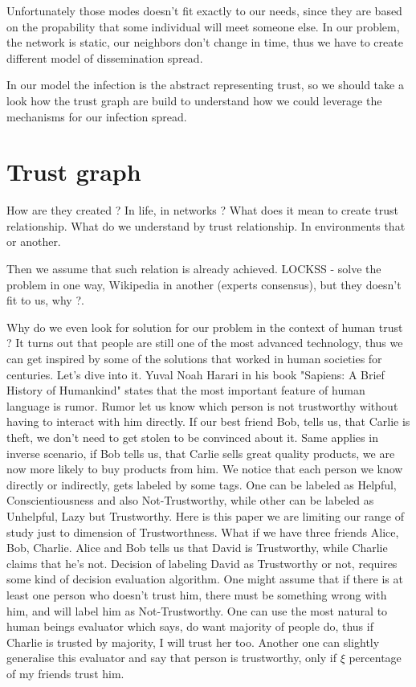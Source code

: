 \documentclass[nostrict]{szablonPG}
\begin{document}
Unfortunately those modes doesn't fit exactly to our needs, since they are based on the propability that some individual will meet someone else. In our problem, the network is static, our neighbors don't change in time, thus we have to create different model of dissemination spread. 

In our model the infection is the abstract representing trust, so we should take a look how the trust graph are build to understand how we could leverage the mechanisms for our infection spread.




\section{Trust graph}
How are they created ? In life, in networks ? What does it mean to create trust relationship. What do we understand by trust relationship. In environments that or another. 

Then we assume that such relation is already achieved. 
LOCKSS - solve the problem in one way, Wikipedia in another (experts consensus), but they doesn't fit to us, why ?. 

Why do we even look for solution for our problem in the context of human trust ? It turns out that people are still one of the most advanced technology, thus we can get inspired by some of the solutions that worked in human societies for centuries. Let's dive into it.
Yuval Noah Harari in his book "Sapiens: A Brief History of Humankind" states that the most important feature of human language is rumor. Rumor let us know which person is not trustworthy without having to interact with him directly. If our best friend Bob, tells us, that Carlie is theft, we don't need to get stolen to be convinced about it. Same applies in inverse scenario, if Bob tells us, that Carlie sells great quality products, we are now more likely to buy products from him. We notice that each person we know directly or indirectly, gets labeled by some tags. One can be labeled as Helpful, Conscientiousness and also Not-Trustworthy, while other can be labeled as Unhelpful, Lazy but Trustworthy. Here is this paper we are limiting our range of study just to dimension of Trustworthness.
What if we have three friends Alice, Bob, Charlie. Alice and  Bob tells us that David is Trustworthy, while Charlie claims that he's not. Decision of labeling David as Trustworthy or not, requires some kind of decision evaluation algorithm.
One might assume that if there is at least one person who doesn't trust him, there must be something wrong with him, and will label him as Not-Trustworthy. One can use the most natural to human beings evaluator which says, do want majority of people do, thus if Charlie is trusted by majority, I will trust her too. Another one can slightly generalise this evaluator and say that person is trustworthy, only if $\xi$ percentage of my friends trust him. 
\end{document}
